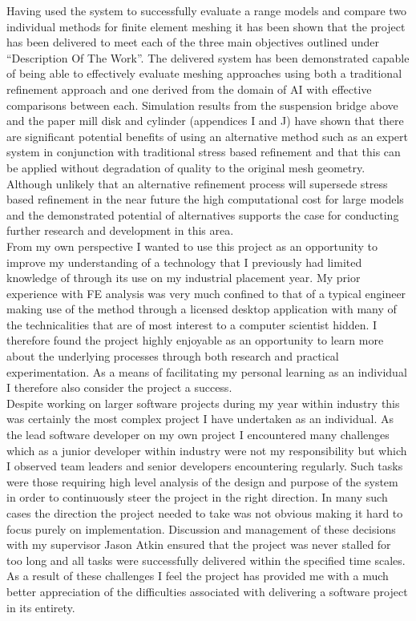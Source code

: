\noindent
Having used the system to successfully evaluate a range models and compare two individual methods for finite element meshing it has been shown that the project has been delivered to meet each of the three main objectives outlined under ``Description Of The Work''. The delivered system has been demonstrated capable of being able to effectively evaluate meshing approaches using both a traditional refinement approach and one derived from the domain of AI with effective comparisons between each. Simulation results from the suspension bridge above and the paper mill disk and cylinder (appendices I and J) have shown that there are significant potential benefits of using an alternative method such as an expert system in conjunction with traditional stress based refinement and that this can be applied without degradation of quality to the original mesh geometry. Although unlikely that an alternative refinement process will supersede stress based refinement in the near future the high computational cost for large models and the demonstrated potential of alternatives supports the case for conducting further research and development in this area. \\


\noindent
From my own perspective I wanted to use this project as an opportunity to improve my understanding of a technology that I previously had limited knowledge of through its use on my industrial placement year. My prior experience with FE analysis was very much confined to that of a typical engineer making use of the method through a licensed desktop application with many of the technicalities that are of most interest to a computer scientist hidden. I therefore found the project highly enjoyable as an opportunity to learn more about the underlying processes through both research and practical experimentation. As a means of facilitating my personal learning as an individual I therefore also consider the project a success. \\ 

\noindent
Despite working on larger software projects during my year within industry this was certainly the most complex project I have undertaken as an individual. As the lead software developer on my own project I encountered many challenges which as a junior developer within industry were not my responsibility but which I observed team leaders and senior developers encountering regularly. Such tasks were those requiring high level analysis of the design and purpose of the system in order to continuously steer the project in the right direction. In  many such cases the direction the project needed to take was not obvious making it hard to focus purely on implementation. Discussion and management of these decisions with my supervisor Jason Atkin ensured that the project was never stalled for too long and all tasks were successfully delivered within the specified time scales. As a result of these challenges I feel the project has provided me with a much better appreciation of the difficulties associated with delivering a software project in its entirety. \\ 

